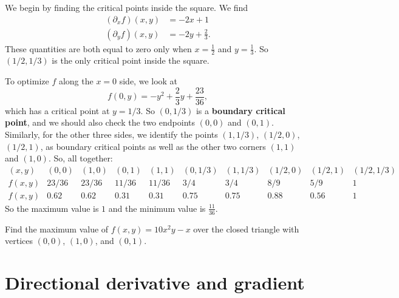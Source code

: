 \documentclass[svgnames]{watsonbook}
\begin{document}
  \begin{solution}
    We begin by finding the critical points inside the square. We find
    \begin{align*}
      (\partial_xf)(x,y) &= -2x + 1  \\
      (\partial_yf)(x,y) &= -2y + \frac{2}{3}. 
    \end{align*}
    These quantities are both equal to zero only when $x =
    \tfrac{1}{2}$ and $y = \frac{1}{3}$. So $(1/2,1/3)$ is the only critical
    point inside the square.

    To optimize $f$ along the $x = 0$ side, we look at
    \[
      f(0,y) = -y^2 + \frac{2}{3}y + \frac{23}{36}, 
    \]
    which has a critical point at $y = 1/3$. So $(0,1/3)$ is a
    \textbf{boundary critical point}, and we should also check the two
    endpoints $(0,0)$ and $(0,1)$. Similarly, for the other three
    sides, we identify the points $(1,1/3)$, $(1/2,0)$, $(1/2,1)$, as
    boundary critical points as well as the other two corners $(1,1)$
    and $(1,0)$. So, all together:
    \[
      \renewcommand\arraystretch{1.4}
      \begin{array}{c|ccccccccc}
       (x,y) &  (0,0) & (1,0) & (0,1) & (1,1) & (0,1/3) & (1,1/3) & (1/2,0) &
                                                                      (1/2,1)
        & (1/2,1/3) \\ \hline
        f(x,y) & 23/36 & 23/36 & 11/36 & 11/36 & 3/4 & 3/4 & 8/9 & 5/9
        & 1 \\
        f(x,y) & 0.62 & 0.62 & 0.31 & 0.31 & 0.75 & 0.75 & 0.88 & 0.56
        & 1
      \end{array}
    \]
    So the maximum value is $\boxed{1}$ and the minimum value is
    $\boxed{\tfrac{11}{36}}$. 
  \end{solution}

  \begin{exercise}{}{}
    Find the maximum value of $f(x,y) = 10x^2y-x$ over the closed
    triangle with vertices $(0,0)$, $(1,0)$, and $(0,1)$.
  \end{exercise}
  
  \section{Directional derivative and gradient} \label{sec:dd_and_grad} 

\end{document}
